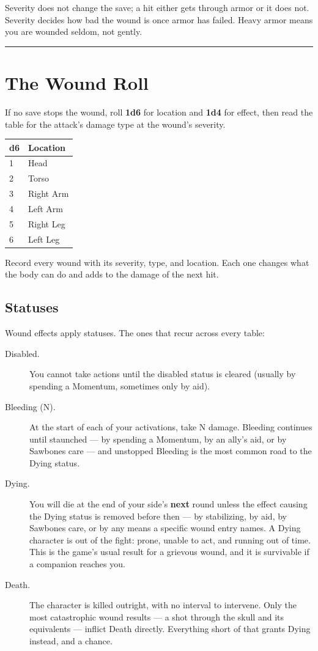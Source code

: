 Severity does not change the save; a hit either gets through armor or it does not. Severity decides how bad the wound is once armor has failed. Heavy armor means you are wounded seldom, not gently.

\medskip\hrule\medskip

\section{The Wound Roll}

If no save stops the wound, roll \textbf{1d6} for location and \textbf{1d4} for effect, then read the table for the attack's damage type at the wound's severity.

\begin{center}
\begin{tabular}{ll}
\textbf{d6} & \textbf{Location} \\
\hline
1 & Head \\
2 & Torso \\
3 & Right Arm \\
4 & Left Arm \\
5 & Right Leg \\
6 & Left Leg \\
\end{tabular}
\end{center}

Record every wound with its severity, type, and location. Each one changes what the body can do and adds to the damage of the next hit.

\subsection{Statuses}

Wound effects apply statuses. The ones that recur across every table:

\begin{description}
    \item[Disabled.] You cannot take actions until the disabled status is cleared (usually by spending a Momentum, sometimes only by aid).
    \item[Bleeding (N).] At the start of each of your activations, take N damage. Bleeding continues until staunched --- by spending a Momentum, by an ally's aid, or by Sawbones care --- and unstopped Bleeding is the most common road to the Dying status.
    \item[Dying.] You will die at the end of your side's \textbf{next} round unless the effect causing the Dying status is removed before then --- by stabilizing, by aid, by Sawbones care, or by any means a specific wound entry names. A Dying character is out of the fight: prone, unable to act, and running out of time. This is the game's usual result for a grievous wound, and it is survivable if a companion reaches you.
    \item[Death.] The character is killed outright, with no interval to intervene. Only the most catastrophic wound results --- a shot through the skull and its equivalents --- inflict Death directly. Everything short of that grants Dying instead, and a chance.
\end{description}

